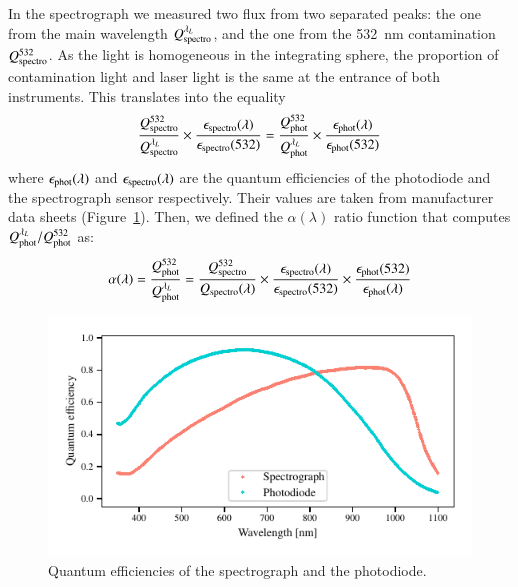 In the spectrograph we measured two flux from two separated peaks: the one from the main wavelength $Q_{\mathrm{spectro}}^{\lambda_L}$, and the one from the \SI{532}{\nm} contamination $Q_{\mathrm{spectro}}^{532}$. As the light is homogeneous in the integrating sphere, the proportion of contamination light and laser light is the same at the entrance of both instruments.  This translates into the equality
\begin{equation}
    \frac{Q_{\mathrm{spectro}}^{532}}{Q_{\mathrm{spectro}}^{\lambda_L}} \times \frac{\epsilon_{\mathrm{spectro}}(\lambda)}{\epsilon_{\mathrm{spectro}}(532)} = \frac{Q_{\mathrm{phot}}^{532}}{Q_{\mathrm{phot}}^{\lambda_L}} \times \frac{\epsilon_{\mathrm{phot}}(\lambda)}{\epsilon_{\mathrm{phot}}(532)}
    \label{eq:prev_alpha}
\end{equation}
where $\epsilon_{\mathrm{phot}}(\lambda)$ and $\epsilon_{\mathrm{spectro}}(\lambda)$ are the quantum efficiencies of the photodiode and the spectrograph sensor respectively. Their values are taken from manufacturer data sheets (Figure~\ref{fig:QEs}). Then, we defined the $\alpha(\lambda)$ ratio function that computes $Q_{\mathrm{phot}}^{\lambda_L}/Q_{\mathrm{phot}}^{532}$ as:
\begin{equation}
    \alpha(\lambda) = \frac{Q_{\mathrm{phot}}^{532}}{Q_{\mathrm{phot}}^{\lambda_L}} = \frac{Q_{\mathrm{spectro}}^{532}}{Q_{\mathrm{spectro}}(\lambda)} \times \frac{\epsilon_{\mathrm{spectro}}(\lambda)}{\epsilon_{\mathrm{spectro}}(532)} \times \frac{\epsilon_{\mathrm{phot}}(532)}{\epsilon_{\mathrm{phot}}(\lambda)}  
    \label{eq:alpha}
\end{equation}

\begin{figure}[h]
    \centering
    \includegraphics[width=\columnwidth]{fig/qe_phototiode_spectro.pdf}
    \caption{Quantum efficiencies of the spectrograph and the photodiode.}
    \label{fig:QEs}
\end{figure}
    

